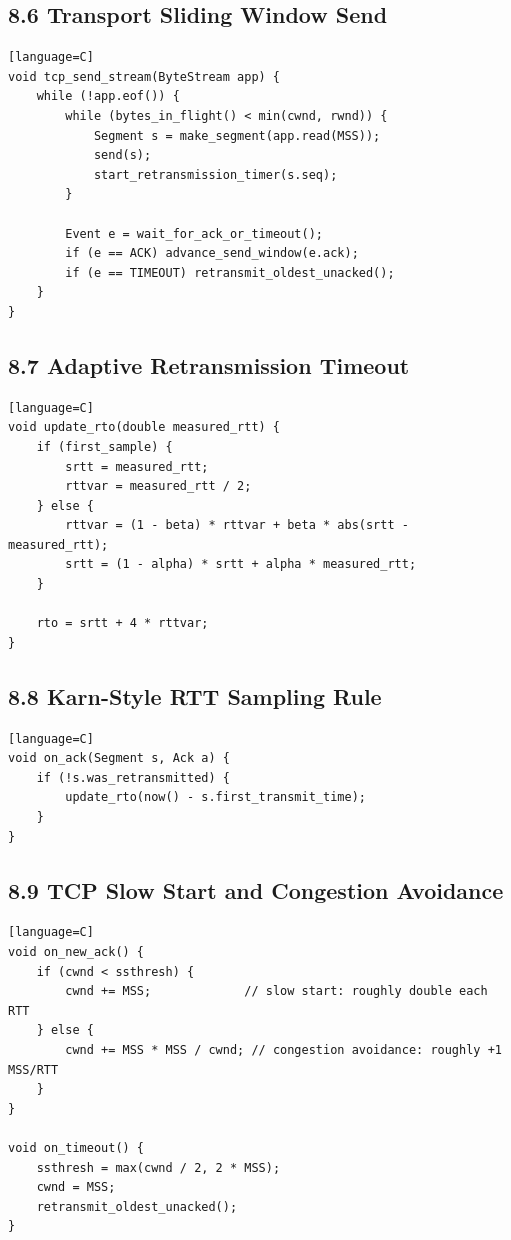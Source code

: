 \documentclass[11pt]{article}
\begin{document}
\subsection{8.6 Transport Sliding Window
Send}\label{transport-sliding-window-send}

\begin{verbatim}[language=C]
void tcp_send_stream(ByteStream app) {
    while (!app.eof()) {
        while (bytes_in_flight() < min(cwnd, rwnd)) {
            Segment s = make_segment(app.read(MSS));
            send(s);
            start_retransmission_timer(s.seq);
        }

        Event e = wait_for_ack_or_timeout();
        if (e == ACK) advance_send_window(e.ack);
        if (e == TIMEOUT) retransmit_oldest_unacked();
    }
}
\end{verbatim}

\subsection{8.7 Adaptive Retransmission
Timeout}\label{adaptive-retransmission-timeout}

\begin{verbatim}[language=C]
void update_rto(double measured_rtt) {
    if (first_sample) {
        srtt = measured_rtt;
        rttvar = measured_rtt / 2;
    } else {
        rttvar = (1 - beta) * rttvar + beta * abs(srtt - measured_rtt);
        srtt = (1 - alpha) * srtt + alpha * measured_rtt;
    }

    rto = srtt + 4 * rttvar;
}
\end{verbatim}

\subsection{8.8 Karn-Style RTT Sampling
Rule}\label{karn-style-rtt-sampling-rule}

\begin{verbatim}[language=C]
void on_ack(Segment s, Ack a) {
    if (!s.was_retransmitted) {
        update_rto(now() - s.first_transmit_time);
    }
}
\end{verbatim}

\subsection{8.9 TCP Slow Start and Congestion
Avoidance}\label{tcp-slow-start-and-congestion-avoidance}

\begin{verbatim}[language=C]
void on_new_ack() {
    if (cwnd < ssthresh) {
        cwnd += MSS;             // slow start: roughly double each RTT
    } else {
        cwnd += MSS * MSS / cwnd; // congestion avoidance: roughly +1 MSS/RTT
    }
}

void on_timeout() {
    ssthresh = max(cwnd / 2, 2 * MSS);
    cwnd = MSS;
    retransmit_oldest_unacked();
}
\end{verbatim}
\end{document}
